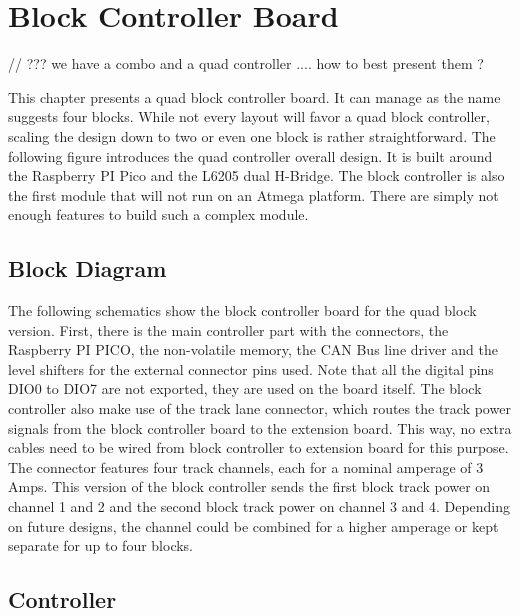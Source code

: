 \chapter{Block Controller Board}


// ??? we have a combo and a quad controller .... how to best present them ?

This chapter presents a quad block controller board. It can manage as the name suggests four blocks. While not every layout will favor a quad block controller, scaling the design down to two or even one block is rather straightforward. The following figure introduces the quad controller overall design. It is built around the Raspberry PI Pico and the L6205 dual H-Bridge. The block controller is also the first module that will not run on an Atmega platform. There are simply not enough features to build such a complex module.

\section{Block Diagram}

The following schematics show the block controller board for the quad block version. First, there is the main controller part with the connectors, the Raspberry PI PICO, the non-volatile memory, the CAN Bus line driver and the level shifters for the external connector pins used. Note that all the digital pins DIO0 to DIO7 are not exported, they are used on the board itself. The block controller also make use of the track lane connector, which routes the track power signals from the block controller board to the extension board. This way, no extra cables need to be wired from block controller to extension board for this purpose. The connector features four track channels, each for a nominal amperage of 3 Amps. This version of the block controller sends the first block track power on channel 1 and 2 and the second block track power on channel 3 and 4. Depending on future designs, the channel could be combined for a higher amperage or kept separate for up to four blocks.


\section{Controller}

